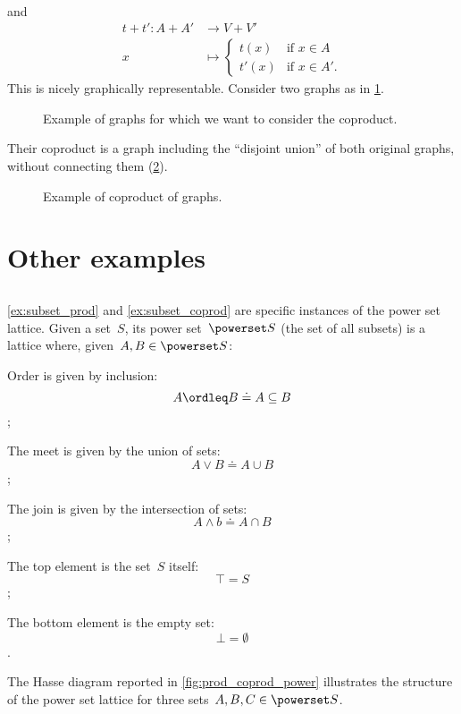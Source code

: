 \begin{example}
\begin{equation*}
\begin{aligned}
    \end{aligned}
  \end{equation*}
  and
  \begin{equation*}
    \begin{aligned}
      t+t'\colon A+ A'&\to V+ V'\\
      x&\mapsto
      \begin{cases}
        t(x)& \text{if } x\in A\\
        t'(x)&\text{if } x\in A'.
      \end{cases}
    \end{aligned}
  \end{equation*}
  This is nicely graphically representable. Consider two graphs as in \cref{fig:graphs_1}.

  \begin{figure}[h!]
    \centering
    \caption{Example of graphs for which we want to consider the coproduct. \label{fig:graphs_1}}
  \end{figure}

  Their coproduct is a graph including the ``disjoint union'' of both original graphs, without connecting them (\cref{fig:graphs_2}).



  \begin{figure}[h!]
    \centering
    \caption{Example of coproduct of graphs. \label{fig:graphs_2}}
  \end{figure}

\end{example}


\section{Other examples}

\subsection{}
\cref{ex:subset_prod} and \cref{ex:subset_coprod} are specific instances of the power set lattice. Given a set~$S$, its power set~$\powerset S$ (the set of all subsets) is a lattice where, given~$A,B\in \powerset S$:
\begin{compactitem}
  \item Order is given by inclusion: $$A\ordleq B \doteq A\subseteq B$$;
  \item The meet is given by the union of sets: $$A\vee B \doteq A\cup B$$;
  \item The join is given by the intersection of sets: $$A\wedge b \doteq A\cap B$$;
  \item The top element is the set~$S$ itself: $$\top = S$$;
  \item The bottom element is the empty set: $$\bot = \emptyset$$.
\end{compactitem}
The Hasse diagram reported in \cref{fig:prod_coprod_power} illustrates the structure of the power set lattice for three sets~$A,B,C\in \powerset S$.

